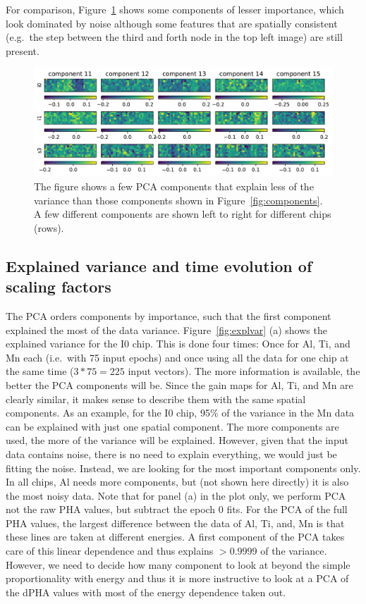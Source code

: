 \documentclass[]{spie}  %
\begin{document}
For comparison, Figure~\ref{fig:components_minor} shows some components of lesser importance, which look dominated by noise although some features that are spatially consistent (e.g.\ the step between the third and forth node in the top left image) are still present.

\begin{figure} [ht]
  \begin{center}
    \includegraphics[width=\textwidth]{figures/components_minor.pdf}
  \end{center}
  \caption
      {The figure shows a few PCA components that explain less of the variance than those components shown in Figure~\ref{fig:components}. A few different components are shown left to right for different chips (rows). \label{fig:components_minor}}
\end{figure}

\subsection{Explained variance and time evolution of scaling factors}

The PCA orders components by importance, such that the first component explained the most of the data variance.  Figure~\ref{fig:explvar} (a) shows the explained variance for the I0 chip.
This is done four times: Once for Al, Ti, and Mn each (i.e.\ with 75 input epochs) and once using all the data for one chip at the same time ($3*75=225$ input vectors). The more information is available, the better the PCA components will be. Since the gain maps for Al, Ti, and Mn are clearly similar, it makes sense to describe them with the same spatial components. As an example, for the I0 chip, 95\% of the variance in the Mn data can be explained with just one spatial component. The more components are used, the more of the variance will be explained. However, given that the input data contains noise, there is no need to explain everything, we would just be fitting the noise. Instead, we are looking for the most important components only. In all chips, Al needs more components, but (not shown here directly) it is also the most noisy data. Note that for panel (a) in the plot only, we perform PCA not the raw PHA values, but subtract the epoch 0 fits. For the PCA of the full PHA values, the largest difference between the data of Al, Ti, and, Mn is that these lines are taken at different energies. A first component of the PCA takes care of this linear dependence and thus explains $>0.9999$ of the variance. However, we need to decide how many component to look at beyond the simple proportionality with energy and thus it is more instructive to look at a PCA of the dPHA values with most of the energy dependence taken out.
\end{document}
